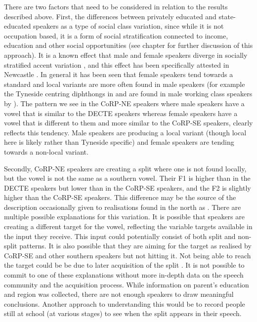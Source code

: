 \documentclass[../../../00.FullDoc/tex/APRReport-year4]{subfiles}
\begin{document}
There are two factors that need to be considered in relation to the results described above.
First, the differences between privately educated and state-educated speakers as a type of social class variation, since while it is not occupation based, it is a form of social stratification connected to income, education and other social opportunities (see chapter \notinsubfile{\ref{ch:LitReviewSocio}} for further discussion of this approach). It is a known effect that male and female speakers diverge in socially stratified accent variation \citep{Labov2001b}, and this effect has been specifically attested in Newcastle \citep{Watt1998}. In general it has been seen that female speakers tend towards a standard and local variants are more often found in male speakers (for example the Tyneside centring diphthongs in \goat{} and  are found in male working class speakers by \cite{Watt1998}). The pattern we see in the CoRP-NE speakers where male speakers have a \strutt{} vowel that is similar to the DECTE speakers whereas female speakers have a \strutt{} vowel that is different to them and more similar to the CoRP-SE speakers, clearly reflects this tendency. Male speakers are producing a local variant (though local here is likely  rather than Tyneside specific) and female speakers are tending towards a non-local variant.

Secondly, CoRP-NE speakers are creating a split where one is not found locally, but the vowel is not the same as a southern \strutt{} vowel. Their F1 is higher than in the DECTE speakers but lower than in the CoRP-SE speakers, and the F2 is slightly higher than the CoRP-SE speakers. This difference may be the source of the description occasionally given to \strutt{} realisations found in the north as  \citep{Braber2015,Jansen2020}. There are multiple possible explanations for this variation. It is possible that speakers are creating a different target for the \strutt{} vowel, reflecting the variable targets available in the input they receive. This input could potentially consist of both split and non-split patterns. It is also possible that they are aiming for the target as realised by CoRP-SE and other southern speakers but not hitting it. Not being able to reach the target could be be due to later acquisition of the split \citep{Evans2007}. It is not possible to commit to one of these explanations without more in-depth data on the speech community and the acquisition process. While information on parent's education and region was collected, there are not enough speakers to draw meaningful conclusions. Another approach to understanding this would be to record people still at school (at various stages) to see when the \FS{} split appears in their speech.
\end{document}
